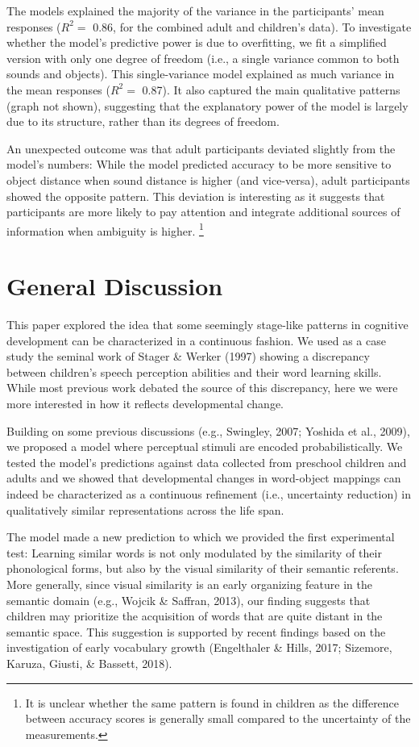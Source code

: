 \documentclass[10pt, letterpaper]{article}
\begin{document}
The models explained the majority of the variance in the participants'
mean responses (\(R^2=\) 0.86, for the combined adult and children's
data). To investigate whether the model's predictive power is due to
overfitting, we fit a simplified version with only one degree of freedom
(i.e., a single variance common to both sounds and objects). This
single-variance model explained as much variance in the mean responses
(\(R^2=\) 0.87). It also captured the main qualitative patterns (graph
not shown), suggesting that the explanatory power of the model is
largely due to its structure, rather than its degrees of freedom.

An unexpected outcome was that adult participants deviated slightly from
the model's numbers: While the model predicted accuracy to be more
sensitive to object distance when sound distance is higher (and
vice-versa), adult participants showed the opposite pattern. This
deviation is interesting as it suggests that participants are more
likely to pay attention and integrate additional sources of information
when ambiguity is higher.
\footnote{It is unclear whether the same pattern is found in children as the difference between accuracy scores is generally small compared to the uncertainty of the measurements.}

\section{General Discussion}\label{general-discussion}

This paper explored the idea that some seemingly stage-like patterns in
cognitive development can be characterized in a continuous fashion. We
used as a case study the seminal work of Stager \& Werker (1997) showing
a discrepancy between children's speech perception abilities and their
word learning skills. While most previous work debated the source of
this discrepancy, here we were more interested in how it reflects
developmental change.

Building on some previous discussions (e.g., Swingley, 2007; Yoshida et
al., 2009), we proposed a model where perceptual stimuli are encoded
probabilistically. We tested the model's predictions against data
collected from preschool children and adults and we showed that
developmental changes in word-object mappings can indeed be
characterized as a continuous refinement (i.e., uncertainty reduction)
in qualitatively similar representations across the life span.

The model made a new prediction to which we provided the first
experimental test: Learning similar words is not only modulated by the
similarity of their phonological forms, but also by the visual
similarity of their semantic referents. More generally, since visual
similarity is an early organizing feature in the semantic domain (e.g.,
Wojcik \& Saffran, 2013), our finding suggests that children may
prioritize the acquisition of words that are quite distant in the
semantic space. This suggestion is supported by recent findings based on
the investigation of early vocabulary growth (Engelthaler \& Hills,
2017; Sizemore, Karuza, Giusti, \& Bassett, 2018).
\end{document}
